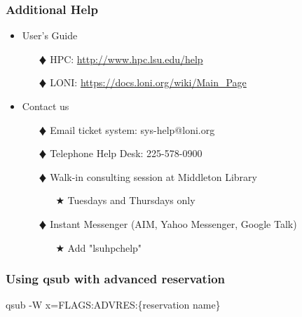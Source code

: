 \documentclass[slidestop,mathserif,compress,xcolor=svgnames,table]{beamer}
\begin{document}
\begin{frame}
\frametitle{\small Additional Help}
\begin{itemize}
\item User's Guide
\begin{enumerate}
\item[$\vardiamond$]HPC: \url{http://www.hpc.lsu.edu/help}
\item[$\vardiamond$]LONI: \url{https://docs.loni.org/wiki/Main_Page}
\end{enumerate}
\item Contact us
\begin{enumerate}
\item[$\vardiamond$]Email ticket system: sys-help@loni.org
\item[$\vardiamond$]Telephone Help Desk: 225-578-0900
\item[$\vardiamond$]Walk-in consulting session at Middleton Library
\begin{enumerate}
\item[$\bigstar$]Tuesdays and Thursdays only
\end{enumerate}
\item[$\vardiamond$]Instant Messenger (AIM, Yahoo Messenger, Google Talk)
\begin{enumerate}
\item[$\bigstar$]Add "lsuhpchelp"
\end{enumerate}
\end{enumerate}
\end{itemize}
\end{frame}

\begin{frame}
\frametitle{\small Using qsub with advanced reservation}
\begin{block}{}
qsub -W x=FLAGS:ADVRES:\{reservation name\}
\end{block}
\end{frame}
\end{document}
